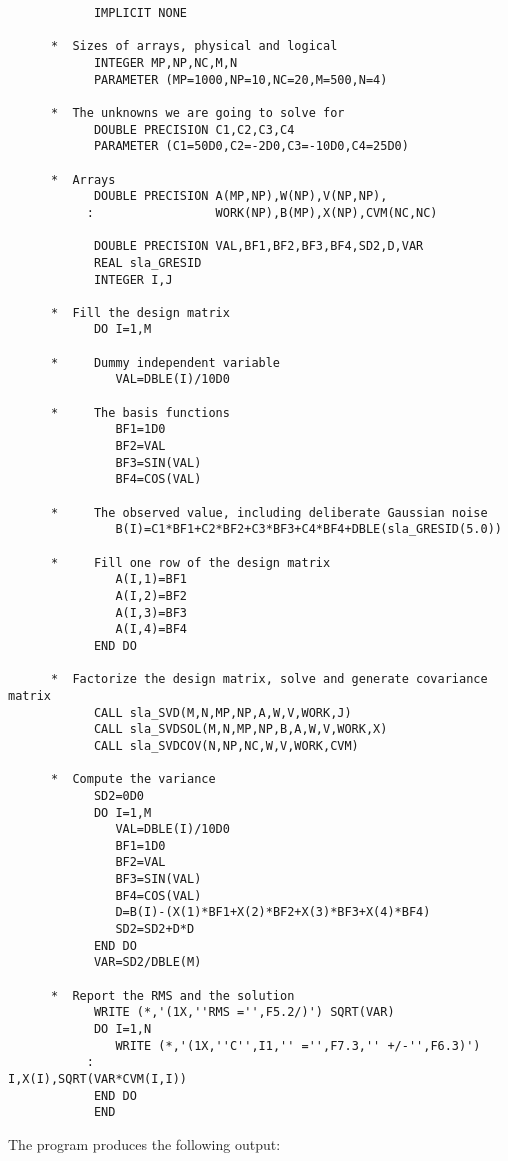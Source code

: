 \documentclass[11pt,twoside]{article}
\begin{document}
\begin{verbatim}
            IMPLICIT NONE

      *  Sizes of arrays, physical and logical
            INTEGER MP,NP,NC,M,N
            PARAMETER (MP=1000,NP=10,NC=20,M=500,N=4)

      *  The unknowns we are going to solve for
            DOUBLE PRECISION C1,C2,C3,C4
            PARAMETER (C1=50D0,C2=-2D0,C3=-10D0,C4=25D0)

      *  Arrays
            DOUBLE PRECISION A(MP,NP),W(NP),V(NP,NP),
           :                 WORK(NP),B(MP),X(NP),CVM(NC,NC)

            DOUBLE PRECISION VAL,BF1,BF2,BF3,BF4,SD2,D,VAR
            REAL sla_GRESID
            INTEGER I,J

      *  Fill the design matrix
            DO I=1,M

      *     Dummy independent variable
               VAL=DBLE(I)/10D0

      *     The basis functions
               BF1=1D0
               BF2=VAL
               BF3=SIN(VAL)
               BF4=COS(VAL)

      *     The observed value, including deliberate Gaussian noise
               B(I)=C1*BF1+C2*BF2+C3*BF3+C4*BF4+DBLE(sla_GRESID(5.0))

      *     Fill one row of the design matrix
               A(I,1)=BF1
               A(I,2)=BF2
               A(I,3)=BF3
               A(I,4)=BF4
            END DO

      *  Factorize the design matrix, solve and generate covariance matrix
            CALL sla_SVD(M,N,MP,NP,A,W,V,WORK,J)
            CALL sla_SVDSOL(M,N,MP,NP,B,A,W,V,WORK,X)
            CALL sla_SVDCOV(N,NP,NC,W,V,WORK,CVM)

      *  Compute the variance
            SD2=0D0
            DO I=1,M
               VAL=DBLE(I)/10D0
               BF1=1D0
               BF2=VAL
               BF3=SIN(VAL)
               BF4=COS(VAL)
               D=B(I)-(X(1)*BF1+X(2)*BF2+X(3)*BF3+X(4)*BF4)
               SD2=SD2+D*D
            END DO
            VAR=SD2/DBLE(M)

      *  Report the RMS and the solution
            WRITE (*,'(1X,''RMS ='',F5.2/)') SQRT(VAR)
            DO I=1,N
               WRITE (*,'(1X,''C'',I1,'' ='',F7.3,'' +/-'',F6.3)')
           :                                         I,X(I),SQRT(VAR*CVM(I,I))
            END DO
            END
\end{verbatim}
\goodbreak
The program produces the following output:
\end{document}
